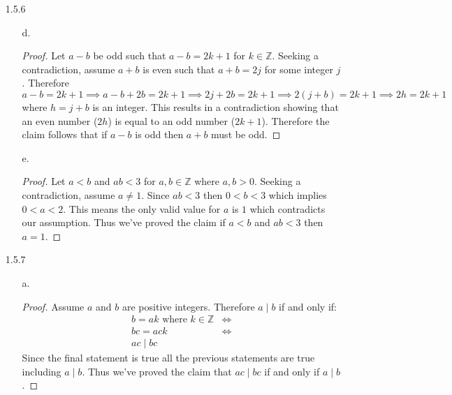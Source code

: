\documentclass[11pt]{amsart}
\theoremstyle{definition}
\begin{document}
\begin{itemize}
\begin{itemize}
\end{itemize}

\item[1.5.6]
\begin{itemize}
    \item[d.] \begin{proof}
        Let $a-b$ be odd such that $a-b=2k+1$ for $k\in\mathbb{Z}$. Seeking a contradiction, assume $a+b$ is even such that $a+b=2j$ for some integer $j$. Therefore $a-b=2k+1\implies a-b+2b=2k+1\implies 2j+2b=2k+1\implies 2(j+b)=2k+1\implies 2h=2k+1$ where $h=j+b$ is an integer. This results in a contradiction showing that an even number ($2h$) is equal to an odd number ($2k+1$). Therefore the claim follows that if $a-b$ is odd then $a+b$ must be odd.
    \end{proof}

    \item[e.] \begin{proof}
        Let $a<b$ and $ab<3$ for $a,b\in\mathbb{Z}$ where $a,b>0$. Seeking a contradiction, assume $a\ne 1$. Since $ab <3$ then $0<b<3$ which implies $0<a<2$. This means the only valid value for $a$ is $1$ which contradicts our assumption. Thus we've proved the claim if $a<b$ and $ab<3$ then $a=1$.
    \end{proof}

\end{itemize}

\item[1.5.7]
\begin{itemize}
    \item[a.] \begin{proof}
        Assume $a$ and $b$ are positive integers. Therefore $a\mid b$ if and only if:
        \begin{align*}
            b=ak\text{ where }k\in\mathbb{Z} &\iff \\
            bc=ack &\iff \\
            ac\mid bc
        \end{align*}
        Since the final statement is true all the previous statements are true including $a\mid b$. Thus we've proved the claim that $ac\mid bc$ if and only if $a\mid b$.
    \end{proof}


\end{itemize}
\end{itemize}
\end{document}
